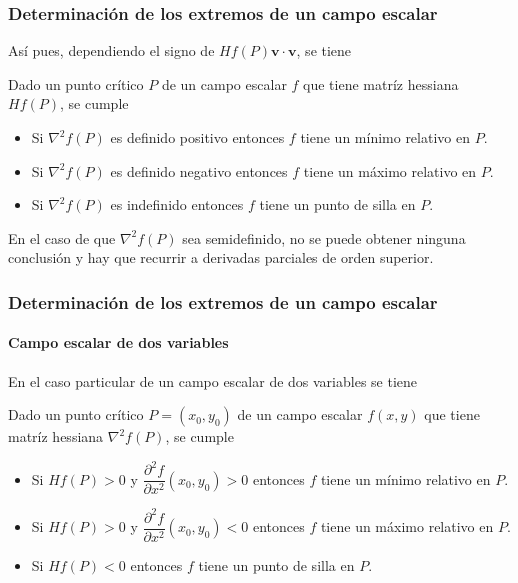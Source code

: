 \begin{frame}
	\frametitle{Determinación de los extremos de un campo escalar}
	Así pues, dependiendo el signo de $Hf(P)\mathbf{v}\cdot\mathbf{v}$, se tiene
	\begin{teorema}
		Dado un punto crítico $P$ de un campo escalar $f$ que tiene matríz hessiana $Hf(P)$, se cumple
		\begin{itemize}
			\item Si $\nabla^2f(P)$ es definido positivo entonces $f$ tiene un mínimo relativo en $P$.
			\item Si $\nabla^2f(P)$ es definido negativo entonces $f$ tiene un máximo relativo en $P$.
			\item Si $\nabla^2f(P)$ es indefinido entonces $f$ tiene un punto de silla en $P$.
		\end{itemize}
	\end{teorema}
	En el caso de que $\nabla^2f(P)$ sea semidefinido, no se puede obtener ninguna conclusión y hay que recurrir a derivadas parciales de orden superior.
\end{frame}


\begin{frame}
	\frametitle{Determinación de los extremos de un campo escalar}
	\framesubtitle{Campo escalar de dos variables}
	En el caso particular de un campo escalar de dos variables se tiene
	\begin{teorema}
		Dado un punto crítico $P=(x_0,y_0)$ de un campo escalar $f(x,y)$ que tiene matríz hessiana $\nabla^2f(P)$, se cumple
		\begin{itemize}
			\item Si $Hf(P)>0$ y $\dfrac{\partial^2 f}{\partial x^2}(x_0,y_0)>0$ entonces $f$ tiene un mínimo relativo en $P$.
			\item Si $Hf(P)>0$ y $\dfrac{\partial^2 f}{\partial x^2}(x_0,y_0)<0$ entonces $f$ tiene un máximo relativo en $P$.
			\item Si $Hf(P)<0$ entonces $f$ tiene un punto de silla en $P$.
		\end{itemize}
	\end{teorema}
\end{frame}



